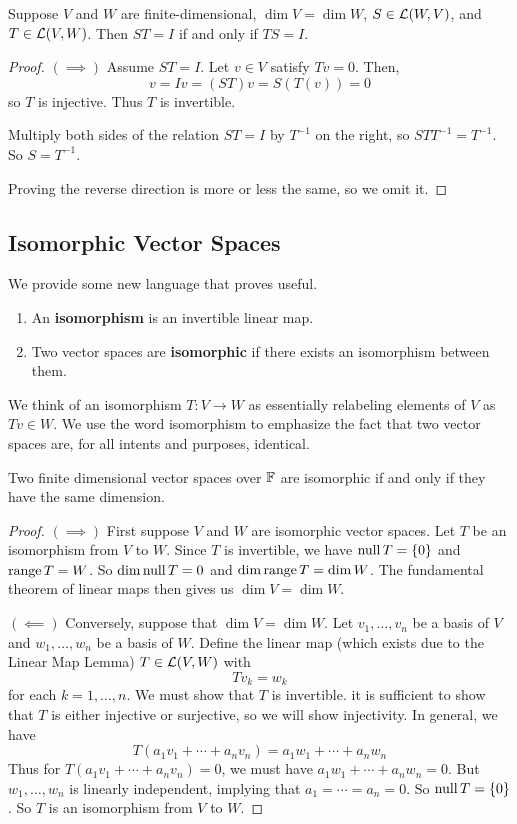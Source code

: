 \begin{theorem}[$ST = I \iff TS = I$ (on vector spaces of the same dimension)]
    Suppose $V$ and $W$ are finite-dimensional, $\dim V = \dim W$, $S\in\mathcal{L}(W,V)$, and $T\in\mathcal{L}(V,W)$. Then $ST = I$ if and only if $TS = I$.
\end{theorem}
\begin{proof}
    $(\implies)$ Assume $ST = I$. Let $v\in V$ satisfy $Tv = 0$. Then,
    \[ v = Iv = (ST)v = S(T(v)) = 0\]
    so $T$ is injective. Thus $T$ is invertible. 

    Multiply both sides of the relation $ST = I$ by $T^{-1}$ on the right, so $STT^{-1} = T^{-1}$. So $S = T^{-1}$.

    Proving the reverse direction is more or less the same, so we omit it.
\end{proof}
\subsection*{Isomorphic Vector Spaces}
We provide some new language that proves useful.
\begin{definition}
    \begin{enumerate}
        \item An \textbf{isomorphism} is an invertible linear map.
        \item Two vector spaces are \textbf{isomorphic} if there exists an isomorphism between them.
    \end{enumerate}
\end{definition}
We think of an isomorphism $T: V\to W$ as essentially relabeling elements of $V$ as $Tv\in W$. We use the word isomorphism to emphasize the fact that two vector spaces are, for all intents and purposes, identical.
\begin{theorem}
    Two finite dimensional vector spaces over $\mathbb F$ are isomorphic if and only if they have the same dimension.
\end{theorem}
\begin{proof}
    $(\implies)$ First suppose $V$ and $W$ are isomorphic vector spaces. Let $T$ be an isomorphism from $V$ to $W$. Since $T$ is invertible, we have $\operatorname{null} T = \{0\}$ and $\operatorname{range} T = W$. So $\dim\operatorname{null} T = 0$ and $\dim\operatorname{range} T = \dim W$. The fundamental theorem of linear maps then gives us $\dim V = \dim W$.

    $(\impliedby)$ Conversely, suppose that $\dim V = \dim W$. Let $v_1, \dots, v_n$ be a basis of $V$ and $w_1, \dots, w_n$ be a basis of $W$. Define the linear map (which exists due to the Linear Map Lemma) $T\in\mathcal{L}(V,W)$ with
    \[ Tv_k = w_k \]
    for each $k = 1, \dots, n$. We must show that $T$ is invertible. it is sufficient to show that $T$ is either injective or surjective, so we will show injectivity. In general, we have
    \[ T(a_1v_1 + \cdots + a_nv_n) = a_1w_1 + \cdots + a_nw_n \]
    Thus for $T(a_1v_1 + \cdots + a_nv_n) = 0$, we must have $a_1w_1 + \cdots + a_nw_n = 0$. But $w_1, \dots, w_n$ is linearly independent, implying that $a_1 = \cdots = a_n = 0$. So $\operatorname{null} T = \{0\}$. So $T$ is an isomorphism from $V$ to $W$.
\end{proof}
